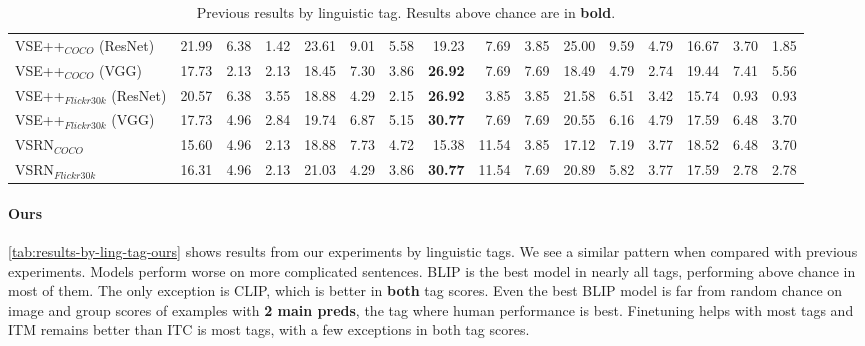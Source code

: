 \begin{table}[ht]
\begin{adjustbox}{max width=\textwidth}
\begin{tabular}{l|rrr|rrr|rrr|rrr|rrr}
 VSE++$_{COCO}$ (ResNet)      & 21.99          & 6.38           & 1.42           & 23.61          & 9.01           & 5.58           & 19.23          & 7.69           & 3.85           & 25.00          & 9.59           & 4.79           & 16.67          & 3.70           & 1.85           \\
 VSE++$_{COCO}$ (VGG)         & 17.73          & 2.13           & 2.13           & 18.45          & 7.30           & 3.86           & \textbf{26.92} & 7.69           & 7.69           & 18.49          & 4.79           & 2.74           & 19.44          & 7.41           & 5.56           \\
 VSE++$_{Flickr30k}$ (ResNet) & 20.57          & 6.38           & 3.55           & 18.88          & 4.29           & 2.15           & \textbf{26.92} & 3.85           & 3.85           & 21.58          & 6.51           & 3.42           & 15.74          & 0.93           & 0.93           \\
 VSE++$_{Flickr30k}$ (VGG)    & 17.73          & 4.96           & 2.84           & 19.74          & 6.87           & 5.15           & \textbf{30.77} & 7.69           & 7.69           & 20.55          & 6.16           & 4.79           & 17.59          & 6.48           & 3.70           \\
 VSRN$_{COCO}$                & 15.60          & 4.96           & 2.13           & 18.88          & 7.73           & 4.72           & 15.38          & 11.54          & 3.85           & 17.12          & 7.19           & 3.77           & 18.52          & 6.48           & 3.70           \\
 VSRN$_{Flickr30k}$           & 16.31          & 4.96           & 2.13           & 21.03          & 4.29           & 3.86           & \textbf{30.77} & 11.54          & 7.69           & 20.89          & 5.82           & 3.77           & 17.59          & 2.78           & 2.78           \\
          \bottomrule
  \end{tabular}
  \end{adjustbox}
  \caption{Previous results by linguistic tag. Results above chance are in \textbf{bold}.}
    \label{tab:results-by-ling-tag-baseline}
\end{table}

\paragraph{Ours}

\cref{tab:results-by-ling-tag-ours} shows results from our experiments by linguistic tags. We see a similar pattern when compared with previous experiments. Models perform worse on more complicated sentences. BLIP is the best model in nearly all tags, performing above chance in most of them. The only exception is CLIP, which is better in \textbf{both} tag scores. Even the best BLIP model is far from random chance on image and group scores of examples with \textbf{2 main preds}, the tag where human performance is best. Finetuning helps with most tags and ITM remains better than ITC is most tags, with a few exceptions in both tag scores.

